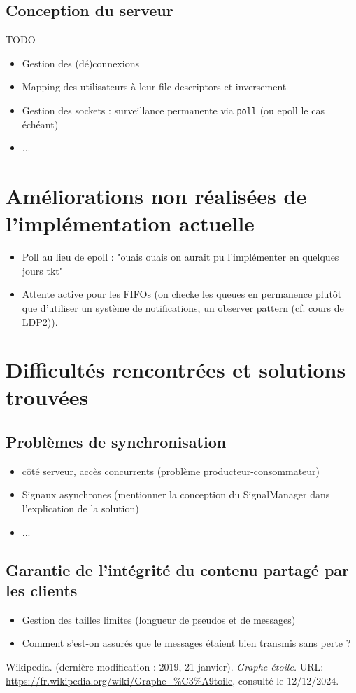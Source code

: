 \documentclass{article}
\begin{document}
\subsection{Conception du serveur}


TODO
\begin{itemize}
    \item Gestion des (dé)connexions
    \item Mapping des utilisateurs à leur file descriptors et inversement
    \item Gestion des sockets : surveillance permanente via \texttt{poll} (ou epoll le cas échéant)
    \item ...

\end{itemize}

\section{Améliorations non réalisées de l'implémentation actuelle}
\begin{itemize}
    \item Poll au lieu de epoll : "ouais ouais on aurait pu l'implémenter en quelques jours tkt"
    \item Attente active pour les FIFOs (on checke les queues en permanence plutôt que d'utiliser un système de notifications, un observer pattern (cf. cours de LDP2)).
\end{itemize}

\section{Difficultés rencontrées et solutions trouvées}
\subsection{Problèmes de synchronisation}
\begin{itemize}
    \item côté serveur, accès concurrents (problème producteur-consommateur)
    \item Signaux asynchrones (mentionner la conception du SignalManager dans l'explication de la solution)
    \item ...
\end{itemize}

\subsection{Garantie de l'intégrité du contenu partagé par les clients}
\begin{itemize}
    \item Gestion des tailles limites (longueur de pseudos et de messages)
    \item Comment s'est-on assurés que le messages étaient bien transmis sans perte ?
\end{itemize}


\begin{thebibliography}{999}
		Wikipedia. (dernière modification : 2019, 21 janvier). \textit{Graphe étoile.} URL: \url{https://fr.wikipedia.org/wiki/Graphe_%C3%A9toile}, consulté le 12/12/2024.
\end{thebibliography}
\end{document}
